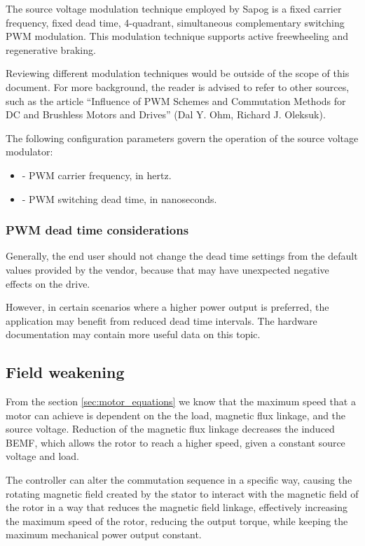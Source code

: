 \documentclass{zubaxdoc}
\begin{document}
The source voltage modulation technique employed by Sapog is a fixed carrier frequency, fixed dead time,
4-quadrant, simultaneous complementary switching PWM modulation.
This modulation technique supports active freewheeling and regenerative braking.

Reviewing different modulation techniques would be outside of the scope of this document.
For more background, the reader is advised to refer to other sources, such as the article
``Influence of PWM Schemes and Commutation Methods for DC and Brushless Motors and Drives''
(Dal Y. Ohm, Richard J. Oleksuk).

The following configuration parameters govern the operation of the source voltage modulator:
\begin{itemize}
\item {} - PWM carrier frequency, in hertz.
\item {} - PWM switching dead time, in nanoseconds.
\end{itemize}

\subsubsection{PWM dead time considerations}

Generally, the end user should not change the dead time settings from the default values provided by
the vendor, because that may have unexpected negative effects on the drive.

However, in certain scenarios where a higher power output is preferred, the application may benefit from
reduced dead time intervals.
The hardware documentation may contain more useful data on this topic.

\subsection{Field weakening}\label{sec:field_weakening}

From the section \ref{sec:motor_equations} we know that the maximum speed that a motor can achieve is dependent
on the the load, magnetic flux linkage, and the source voltage.
Reduction of the magnetic flux linkage decreases the induced BEMF, which allows the rotor to reach a higher speed,
given a constant source voltage and load.

The controller can alter the commutation sequence in a specific way, causing the rotating magnetic field
created by the stator to interact with the magnetic field of the rotor in a way that reduces the magnetic
field linkage, effectively increasing the maximum speed of the rotor, reducing the output torque,
while keeping the maximum mechanical power output constant.
\end{document}
